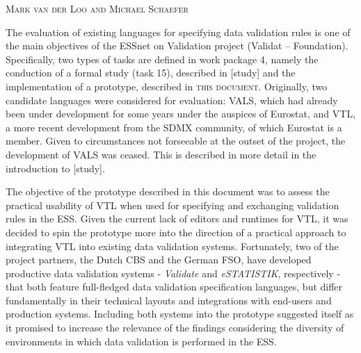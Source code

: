 \textsc{Mark van der Loo and Michael Schaefer}
\vspace{0.6 cm}

The evaluation of existing languages for specifying data validation rules is one of the main objectives of the ESSnet on Validation project (Validat – Foundation). Specifically, two types of tasks are defined in work package 4, namely the conduction of a formal study (task 15), described in [study] and the implementation of a prototype, described in \textsc{this document}. Originally, two candidate languages were considered for evaluation: VALS, which had already been under development for some years under the auspices of Eurostat, and VTL, a more recent development from the SDMX community, of which Eurostat is a member. Given to circumstances not forseeable at the outset of the project, the development of VALS was ceased. This is described in more detail in the introduction to [study].

The objective of the prototype described in this document was to assess the practical usability of VTL when used for specifying and exchanging validation rules in the ESS. Given the current lack of editors and runtimes for VTL, it was decided to spin the prototype more into the direction of a practical approach to integrating VTL into existing data validation systems. Fortunately, two of the project partners, the Dutch CBS and the German FSO, have developed productive data validation systems -  \textit{Validate} and \textit{eSTATISTIK}, respectively - that both feature full-fledged data validation specification languages, but differ fundamentally in their technical layouts and integrations with end-users and production systems. Including both systems into the prototype suggested itself as it promised to increase the relevance of the findings considering the diversity of environments in which data validation is performed in the ESS.
